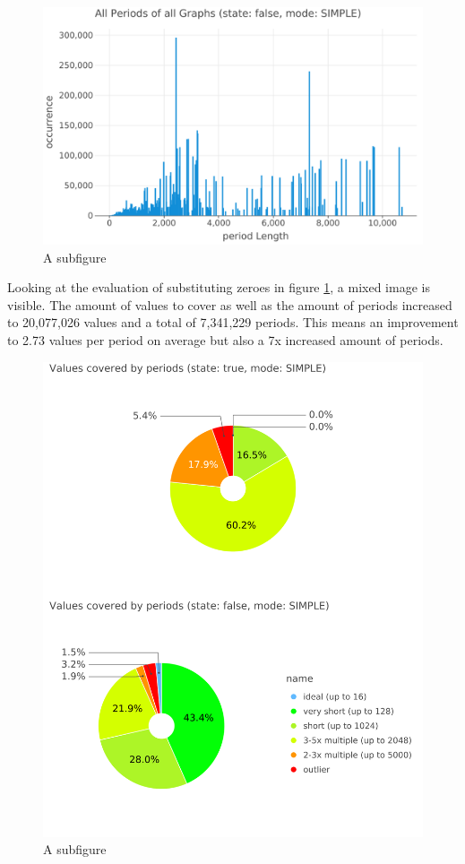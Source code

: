 \begin{figure}[h]
	\includegraphics[width=\linewidth]{charts/all-graphs-bar-char-sfalse-mSIMPLE.png}
	\caption{A subfigure}
	\label{fig:plot-all-periods-false-state}
\end{figure}

Looking at the evaluation of substituting zeroes in figure \ref{fig:plot-all-periods-false-state}, a mixed image is visible. The amount of values to cover as well as the amount of periods increased to 20,077,026 values and a total of 7,341,229 periods. This means an improvement to 2.73 values per period on average but also a 7x increased amount of periods.

\begin{figure}[h]
	\includegraphics[width=\linewidth]{charts/all-covered-values-pie-chart-combined-ontop.png}
	\caption{A subfigure}
	\label{fig:sub2}
\end{figure}

